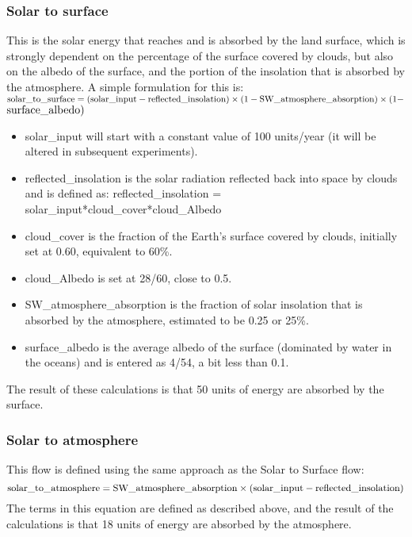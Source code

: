 \documentclass[11pt,letterpaper]{article}
\begin{document}
\subsubsection*{Solar to surface}
This is the solar energy that reaches and is absorbed by the land surface, which is strongly dependent on the percentage of the surface
covered by clouds, but also on the albedo of the surface, and the portion of the insolation that is absorbed by the atmosphere. A simple
formulation for this is:
$\rm solar\_to\_surface = (solar\_input-reflected\_insolation) \times (1-SW\_atmosphere\_absorption) \times (1-$ $\rm surface\_albedo)$
\begin{itemize}
\item solar\_input will start with a constant value of 100 units/year (it will be altered in subsequent experiments). 
\item reflected\_insolation is the solar radiation reflected back into space by clouds and is defined as:
reflected\_insolation = solar\_input*cloud\_cover*cloud\_Albedo
\item cloud\_cover is the fraction of the Earth's surface covered by clouds, initially set at 0.60, equivalent to 60\%. 
\item cloud\_Albedo is set at 28/60, close to 0.5. 
\item SW\_atmosphere\_absorption is the fraction of solar insolation that is absorbed by the atmosphere, estimated to be 0.25 or 25\%. 
\item surface\_albedo is the average albedo of the surface (dominated by water in the oceans) and is entered as 4/54, a bit less than 0.1.
\end{itemize}

The result of these calculations is that 50 units of energy are absorbed by the surface.

\subsubsection*{Solar to atmosphere}
This flow is defined using the same approach as the Solar to Surface flow:
$$\rm solar\_to\_atmosphere = SW\_atmosphere\_absorption \times (solar\_input-reflected\_insolation)$$
The terms in this equation are defined as described above, and the result of the calculations is that 18 units of energy are absorbed by
the atmosphere.
\end{document}
